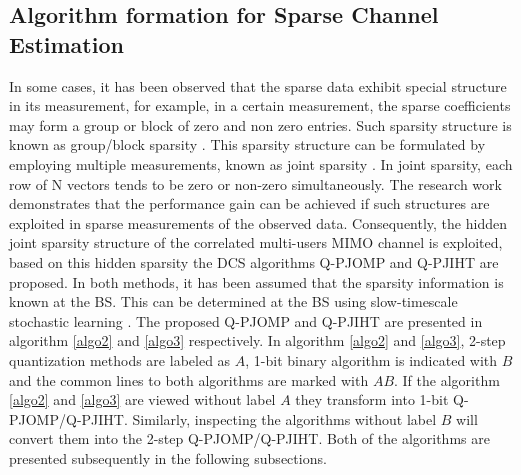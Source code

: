 \subsection{ Algorithm formation for Sparse Channel Estimation}
In some cases, it has been observed that the sparse data exhibit special structure in its measurement, for example, in a certain measurement, the sparse coefficients may form a group or block of zero and non zero entries. Such sparsity structure is known as group/block sparsity \cite{beamblock,our_intrabody,Dekorsy12}. This sparsity structure can be formulated by employing multiple measurements, known as joint sparsity \cite{mainref-joint,mainref-1bit,antenna_spacing_sparse}. In joint sparsity, each row of N vectors tends to be zero or non-zero simultaneously. The research work \cite{structured_sparsity} demonstrates that the performance gain can be achieved if such structures are exploited in sparse measurements of the observed data. 
Consequently,  the hidden joint sparsity structure of the correlated multi-users MIMO channel is exploited, based on this hidden sparsity the DCS algorithms Q-PJOMP and Q-PJIHT  are proposed. In both methods, it has been assumed that the sparsity information is known at the BS. This can be determined at the BS using slow-timescale stochastic learning \cite{stochastic_ch_info,scattering_model}.
The proposed Q-PJOMP and Q-PJIHT are presented in algorithm \ref{algo2} and \ref{algo3} respectively. In algorithm \ref{algo2} and \ref{algo3},  2-step quantization methods are labeled as $A$, 1-bit binary algorithm is indicated with $B$ and the common lines to both algorithms are marked with $AB$. If the algorithm \ref{algo2} and \ref{algo3} are viewed without label $A$ they transform into 1-bit Q-PJOMP/Q-PJIHT.  Similarly, inspecting the algorithms without label $B$ will convert them into the 2-step Q-PJOMP/Q-PJIHT. Both of the algorithms are presented subsequently in the following subsections.

